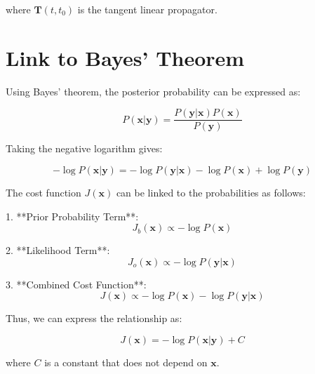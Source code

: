 \documentclass{article}
\begin{document}
where \( \mathbf{T}(t, t_0) \) is the tangent linear propagator.

\section{Link to Bayes' Theorem}

Using Bayes' theorem, the posterior probability can be expressed as:

\[
P(\mathbf{x} | \mathbf{y}) = \frac{P(\mathbf{y} | \mathbf{x}) P(\mathbf{x})}{P(\mathbf{y})}
\]

Taking the negative logarithm gives:

\[
-\log P(\mathbf{x} | \mathbf{y}) = -\log P(\mathbf{y} | \mathbf{x}) - \log P(\mathbf{x}) + \log P(\mathbf{y})
\]

The cost function \( J(\mathbf{x}) \) can be linked to the probabilities as follows:

1. **Prior Probability Term**:
   \[
   J_b(\mathbf{x}) \propto -\log P(\mathbf{x})
   \]

2. **Likelihood Term**:
   \[
   J_o(\mathbf{x}) \propto -\log P(\mathbf{y} | \mathbf{x})
   \]

3. **Combined Cost Function**:
   \[
   J(\mathbf{x}) \propto -\log P(\mathbf{x}) - \log P(\mathbf{y} | \mathbf{x})
   \]

Thus, we can express the relationship as:

\[
J(\mathbf{x}) = -\log P(\mathbf{x} | \mathbf{y}) + C
\]

where \( C \) is a constant that does not depend on \( \mathbf{x} \).
\end{document}
